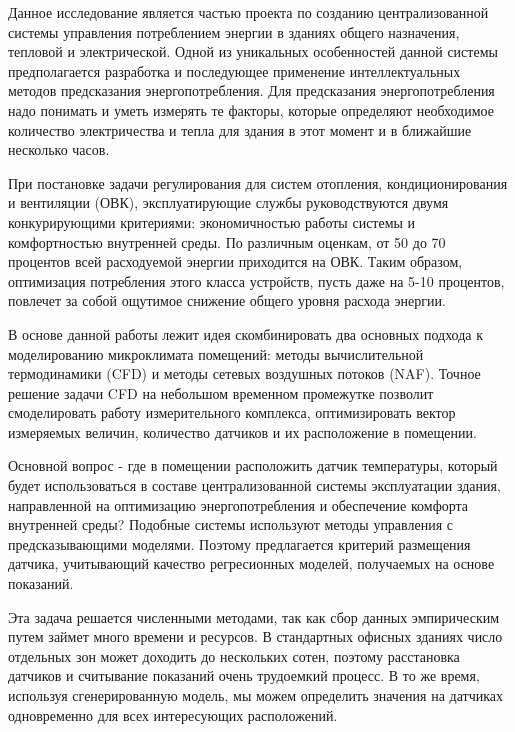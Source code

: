 
Данное исследование является частью проекта по созданию централизованной системы управления потреблением энергии в зданиях общего назначения, тепловой и электрической. Одной из уникальных особенностей данной системы предполагается разработка и последующее применение интеллектуальных методов предсказания энергопотребления. Для предсказания энергопотребления надо понимать и уметь измерять те факторы, которые определяют необходимое количество электричества и тепла для здания в этот момент и в ближайшие несколько часов.

При постановке задачи регулирования для систем отопления, кондиционирования и вентиляции (ОВК), эксплуатирующие службы руководствуются двумя конкурирующими критериями: экономичностью работы системы и комфортностью внутренней среды. По различным оценкам, от 50 до 70 процентов всей расходуемой энергии приходится на ОВК. Таким образом, оптимизация потребления этого класса устройств, пусть даже на 5-10 процентов, повлечет за собой ощутимое снижение общего уровня расхода энергии. 

В основе данной работы лежит идея скомбинировать два основных подхода к моделированию микроклимата помещений: методы вычислительной термодинамики \cite{cfd}(CFD) и методы сетевых воздушных потоков (NAF). Точное решение задачи CFD на небольшом временном промежутке позволит смоделировать работу измерительного комплекса, оптимизировать вектор измеряемых величин, количество датчиков и их расположение в помещении. 


\newpage


Основной вопрос - где в помещении расположить датчик температуры, который будет использоваться в составе централизованной системы эксплуатации здания, направленной на оптимизацию энергопотребления и обеспечение комфорта внутренней среды? Подобные системы используют методы управления с предсказывающими моделями. Поэтому предлагается критерий размещения датчика, учитывающий качество регресионных моделей, получаемых на основе показаний. 

Эта задача решается численными методами, так как сбор данных эмпирическим путем займет много времени и ресурсов. В стандартных офисных зданиях число отдельных зон может доходить до нескольких сотен, поэтому расстановка датчиков и считывание показаний очень трудоемкий процесс. В то же время, используя сгенерированную модель, мы можем определить значения на датчиках одновременно для всех интересующих расположений.

